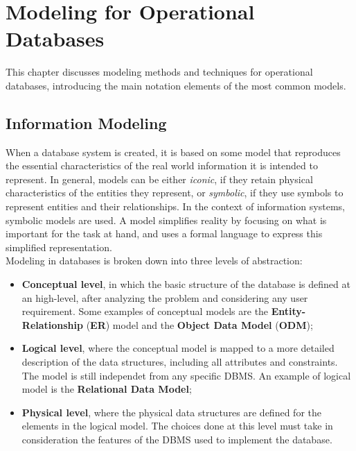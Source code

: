 \chapter{Modeling for Operational Databases}

This chapter discusses modeling methods and techniques for operational databases, introducing the main notation elements of the most common models.

\section{Information Modeling}

When a database system is created, it is based on some model that reproduces the essential characteristics of the real world information it is intended to represent. In general, models can be either \textit{iconic}, if they retain physical characteristics of the entities they represent, or \textit{symbolic}, if they use symbols to represent entities and their relationships. In the context of information systems, symbolic models are used.
A model simplifies reality by focusing on what is important for the task at hand, and uses a formal language to express this simplified representation.\\
Modeling in databases is broken down into three levels of abstraction:
\begin{itemize}
    \item \textbf{Conceptual level}, in which the basic structure of the database is defined at an high-level, after analyzing the problem and considering any user requirement. Some examples of conceptual models are the \textbf{Entity-Relationship} (\textbf{ER}) model and the \textbf{Object Data Model} (\textbf{ODM});
    \item \textbf{Logical level}, where the conceptual model is mapped to a more detailed description of the data structures, including all attributes and constraints. The model is still independet from any specific DBMS. An example of logical model is the \textbf{Relational Data Model};
    \item \textbf{Physical level}, where the physical data structures are defined for the elements in the logical model. The choices done at this level must take in consideration the features of the DBMS used to implement the database.
\end{itemize}

